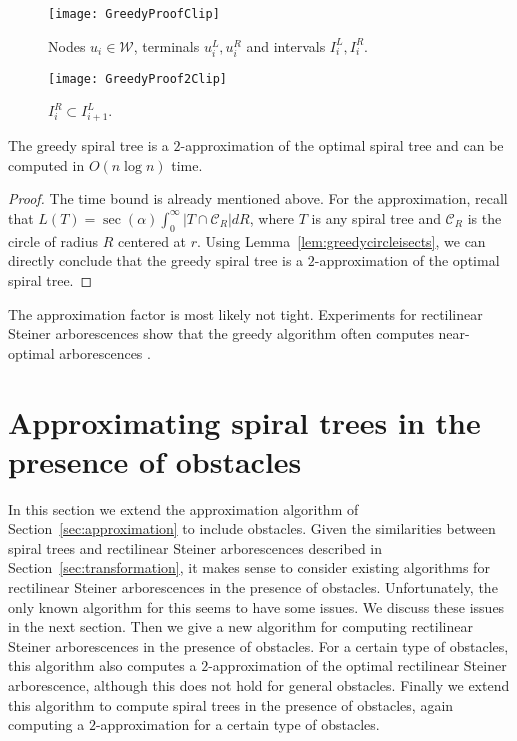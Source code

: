 \documentclass{journalA4}
\begin{document}
\begin{figure}[t]
  \centering
  \begin{minipage}[t]{.6\textwidth}
  \centering
  \texttt{[image: GreedyProofClip]}
  \caption{Nodes $u_i \in \mathcal{W}$, terminals $u^L_i, u^R_i$ and intervals $I^L_i, I^R_i$.}
  \label{fig:GreedyProof}
  \end{minipage}
  \hfill
  \begin{minipage}[t]{.35\textwidth}
  \centering
  \texttt{[image: GreedyProof2Clip]}
  \caption{$I^R_i \subset I^L_{i+1}$.}
  \label{fig:GreedyProof2}
  \end{minipage}
\end{figure}

\begin{theorem}
The greedy spiral tree is a $2$-approximation of the optimal spiral tree and can be computed in $O(n \log n)$ time.
\end{theorem}
\begin{proof}
The time bound is already mentioned above. For the approximation, recall that $L(T) = \sec(\alpha) \int_0^\infty |T \cap \mathcal{C}_R| dR$, where $T$ is any spiral tree and
$\mathcal{C}_R$ is the circle of radius $R$ centered at $r$. Using Lemma~\ref{lem:greedycircleisects}, we can directly conclude that the greedy spiral tree is a $2$-approximation
of the optimal spiral tree.
\end{proof}

\noindent The approximation factor is most likely not tight. Experiments for rectilinear Steiner arborescences show that the greedy algorithm
often computes near-optimal arborescences \cite{Cordova94}.


\section{Approximating spiral trees in the presence of obstacles}\label{sec:obstacles}

In this section we extend the approximation algorithm of Section~\ref{sec:approximation} to include obstacles. Given the similarities between spiral trees and rectilinear Steiner arborescences described in Section~\ref{sec:transformation}, it makes sense to consider existing algorithms for rectilinear Steiner arborescences in the presence of obstacles. Unfortunately, the only known algorithm for this seems to have some issues. We discuss these issues in the next section. Then we give a new algorithm for computing rectilinear Steiner arborescences in the presence of obstacles. For a certain type of obstacles, this algorithm also computes a $2$-approximation of the optimal rectilinear Steiner arborescence, although this does not hold for general obstacles. Finally we extend this algorithm to compute spiral trees in the presence of obstacles, again computing a $2$-approximation for a certain type of obstacles.
\end{document}

